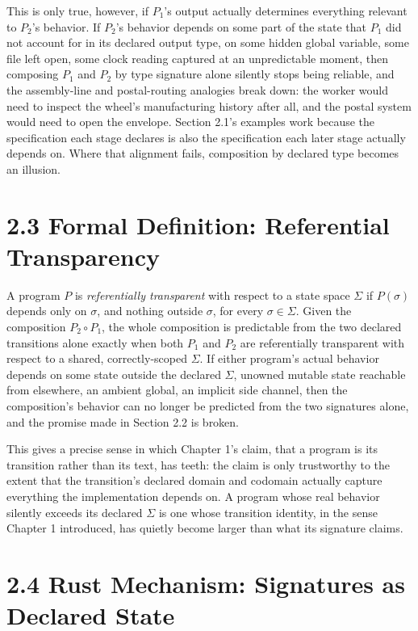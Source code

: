 \documentclass[11pt]{book}
\begin{document}
This is only true, however, if $P_1$'s output actually determines everything relevant to $P_2$'s behavior. If $P_2$'s behavior depends on some part of the state that $P_1$ did not account for in its declared output type, on some hidden global variable, some file left open, some clock reading captured at an unpredictable moment, then composing $P_1$ and $P_2$ by type signature alone silently stops being reliable, and the assembly-line and postal-routing analogies break down: the worker would need to inspect the wheel's manufacturing history after all, and the postal system would need to open the envelope. Section 2.1's examples work because the specification each stage declares is also the specification each later stage actually depends on. Where that alignment fails, composition by declared type becomes an illusion.

\section*{2.3 Formal Definition: Referential Transparency}

A program $P$ is \emph{referentially transparent} with respect to a state space $\Sigma$ if $P(\sigma)$ depends only on $\sigma$, and nothing outside $\sigma$, for every $\sigma \in \Sigma$. Given the composition $P_2 \circ P_1$, the whole composition is predictable from the two declared transitions alone exactly when both $P_1$ and $P_2$ are referentially transparent with respect to a shared, correctly-scoped $\Sigma$. If either program's actual behavior depends on some state outside the declared $\Sigma$, unowned mutable state reachable from elsewhere, an ambient global, an implicit side channel, then the composition's behavior can no longer be predicted from the two signatures alone, and the promise made in Section 2.2 is broken.

This gives a precise sense in which Chapter 1's claim, that a program is its transition rather than its text, has teeth: the claim is only trustworthy to the extent that the transition's declared domain and codomain actually capture everything the implementation depends on. A program whose real behavior silently exceeds its declared $\Sigma$ is one whose transition identity, in the sense Chapter 1 introduced, has quietly become larger than what its signature claims.

\section*{2.4 Rust Mechanism: Signatures as Declared State}
\end{document}
